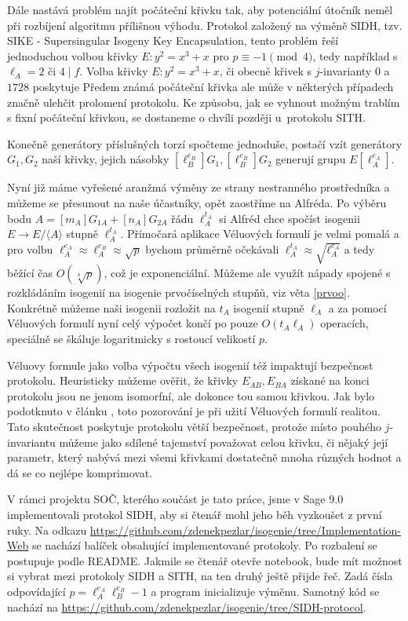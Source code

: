 \documentclass[12pt]{report}
\begin{document}
Dále nastává problém najít počáteční křivku tak, aby potenciální útočník neměl při rozbíjení algoritmu přílišnou výhodu. Protokol založený na výměně SIDH, tzv. SIKE - Supersingular Isogeny Key Encapsulation, tento problém řeší jednoduchou volbou křivky $E : y^2 = x^3+x$ pro $p \equiv -1 \pmod{4}$, tedy například s $\ell_A = 2$ či $4 \mid f$. Volba křivky $E : y^2 = x^3+x$, či obecně křivek s $j$-invarianty $0$ a $1728$ poskytuje 
Předem známá počáteční křivka ale může v některých případech značně ulehčit prolomení protokolu. Ke způsobu, jak se vyhnout možným trablím s fixní počáteční křivkou, se dostaneme o chvíli později u~protokolu SITH.

Konečně generátory příslušných torzí spočteme jednoduše, postačí vzít generátory $G_1,G_2$ naší křivky, jejich násobky $[\ell_B ^{e_B}] G_1, [\ell_B ^{e_B}] G_2$ generují grupu $E[\ell_A ^{e_A}]$.

Nyní již máme vyřešené aranžmá výměny ze strany nestranného prostředníka a můžeme se přesunout na naše účastníky, opět zaostříme na Alfréda. Po výběru bodu $A = [m_A] G_{1A} + [n_A] G_{2A}$ řádu $\ell_A ^{t_A}$ si Alfréd chce spočíst isogenii $E \longrightarrow E/\langle A \rangle$ stupně $\ell_A ^{t_A}$. Přímočará aplikace Véluových formulí je velmi pomalá a pro volbu $\ell_A ^{e_A} \approx \ell_A ^{e_B} \approx \sqrt{p}$ bychom průměrně očekávali $\ell_A ^{t_A} \approx \sqrt{\ell_A ^{e_A}}$ a tedy běžící čas $O(\sqrt[4]{p})$, což je exponenciální. Můžeme ale využít nápady spojené s rozkládáním isogenií na isogenie prvočíselných stupňů, viz věta \ref{prvoo}. Konkrétně můžeme naši isogenii rozložit na $t_A$ isogenií stupně $\ell_A$ a za pomocí Véluových formulí nyní celý výpočet končí po pouze $O(t_A \ell_A)$ operacích, speciálně se škáluje logaritmicky s rostoucí velikostí $p$.

Véluovy formule jako volba výpočtu všech isogenií též impaktují bezpečnost protokolu. Heuristicky můžeme ověřit, že křivky $E_{AB},E_{BA}$ získané na konci protokolu jsou ne jenom isomorfní, ale dokonce tou samou křivkou. Jak bylo podotknuto v článku \cite{Leonardi}, toto pozorování je při užití Véluových formulí realitou. Tato skutečnost poskytuje protokolu větší bezpečnost, protože místo pouhého $j$-invariantu můžeme jako sdílené tajemství považovat celou křivku, či nějaký její parametr, který nabývá mezi všemi křivkami dostatečně mnoha různých hodnot a dá se co nejlépe komprimovat. 

V rámci projektu SOČ, kterého součást je tato práce, jsme v Sage 9.0 implementovali protokol SIDH, aby si čtenář mohl jeho běh vyzkoušet z první ruky. Na odkazu \url{https://github.com/zdenekpezlar/isogenie/tree/Implementation-Web} se nachází balíček obsahující implementované protokoly. Po rozbalení se postupuje podle README. Jakmile se čtenář otevře notebook, bude mít možnost si vybrat mezi protokoly SIDH a SITH, na ten druhý ještě přijde řeč. Zadá čísla odpovídající $p = \ell_A ^{e_A} \ell_B ^{e_B} - 1$ a program inicializuje výměnu. Samotný kód se nachází na \url{https://github.com/zdenekpezlar/isogenie/tree/SIDH-protocol}.
\end{document}

